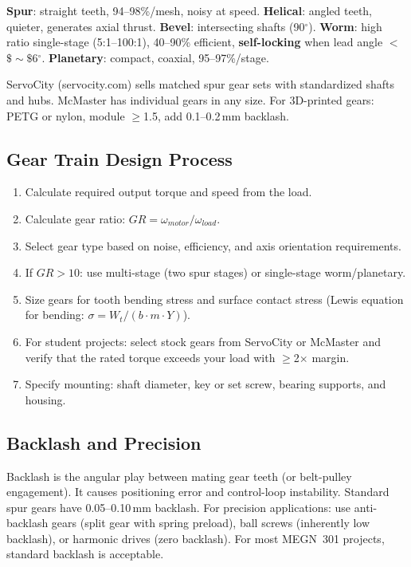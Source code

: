 \documentclass[11pt,letterpaper,twoside,openany]{book}
\providecommand{\ang}[1]{#1\ensuremath{{}^{\circ}}}
\begin{document}
\textbf{Spur}: straight teeth, 94--98\%/mesh, noisy at speed. \textbf{Helical}: angled teeth, quieter, generates axial thrust. \textbf{Bevel}: intersecting shafts (90$^{\circ}$). \textbf{Worm}: high ratio single-stage (5:1--100:1), 40--90\% efficient, \textbf{self-locking} when lead angle $<$$\$\sim\$$\ang{6}. \textbf{Planetary}: compact, coaxial, 95--97\%/stage.

\begin{tipbox}
ServoCity (servocity.com) sells matched spur gear sets with standardized shafts and hubs. McMaster has individual gears in any size. For 3D-printed gears: PETG or nylon, module $\geq$1.5, add 0.1--0.2\,mm backlash.
\end{tipbox}


\subsection{Gear Train Design Process}
\begin{enumerate}[nosep,leftmargin=1.5em]
\item Calculate required output torque and speed from the load.
\item Calculate gear ratio: $GR = \omega_{motor} / \omega_{load}$.
\item Select gear type based on noise, efficiency, and axis orientation requirements.
\item If $GR > 10$: use multi-stage (two spur stages) or single-stage worm/planetary.
\item Size gears for tooth bending stress and surface contact stress (Lewis equation for bending: $\sigma = W_t / (b \cdot m \cdot Y)$).
\item For student projects: select stock gears from ServoCity or McMaster and verify that the rated torque exceeds your load with $\geq$2$\times$ margin.
\item Specify mounting: shaft diameter, key or set screw, bearing supports, and housing.
\end{enumerate}

\subsection{Backlash and Precision}
Backlash is the angular play between mating gear teeth (or belt-pulley engagement). It causes positioning error and control-loop instability. Standard spur gears have 0.05--0.10\,mm backlash. For precision applications: use anti-backlash gears (split gear with spring preload), ball screws (inherently low backlash), or harmonic drives (zero backlash). For most MEGN~301 projects, standard backlash is acceptable.
\end{document}
